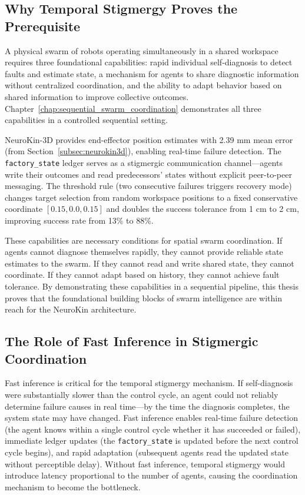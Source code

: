 \documentclass[12pt,a4paper,oneside]{report}
\begin{document}
\subsection{Why Temporal Stigmergy Proves the Prerequisite}
\label{subsec:why_temporal_stigmergy_proves_the_prerequisite_1}

A physical swarm of robots operating simultaneously in a shared workspace requires three foundational capabilities: rapid individual self-diagnosis to detect faults and estimate state, a mechanism for agents to share diagnostic information without centralized coordination, and the ability to adapt behavior based on shared information to improve collective outcomes. Chapter~\ref{chap:sequential_swarm_coordination} demonstrates all three capabilities in a controlled sequential setting.

NeuroKin-3D provides end-effector position estimates with 2.39 mm mean error (from Section~\ref{subsec:neurokin3d}), enabling real-time failure detection. The \texttt{factory\_state} ledger serves as a stigmergic communication channel—agents write their outcomes and read predecessors' states without explicit peer-to-peer messaging. The threshold rule (two consecutive failures triggers recovery mode) changes target selection from random workspace positions to a fixed conservative coordinate $[0.15, 0.0, 0.15]$ and doubles the success tolerance from 1 cm to 2 cm, improving success rate from 13\% to 88\%.

These capabilities are necessary conditions for spatial swarm coordination. If agents cannot diagnose themselves rapidly, they cannot provide reliable state estimates to the swarm. If they cannot read and write shared state, they cannot coordinate. If they cannot adapt based on history, they cannot achieve fault tolerance. By demonstrating these capabilities in a sequential pipeline, this thesis proves that the foundational building blocks of swarm intelligence are within reach for the NeuroKin architecture.

\subsection{The Role of Fast Inference in Stigmergic Coordination}
\label{subsec:the_role_of_fast_inference_in_stigmergic_coordination}

Fast inference is critical for the temporal stigmergy mechanism. If self-diagnosis were substantially slower than the control cycle, an agent could not reliably determine failure causes in real time—by the time the diagnosis completes, the system state may have changed. Fast inference enables real-time failure detection (the agent knows within a single control cycle whether it has succeeded or failed), immediate ledger updates (the \texttt{factory\_state} is updated before the next control cycle begins), and rapid adaptation (subsequent agents read the updated state without perceptible delay). Without fast inference, temporal stigmergy would introduce latency proportional to the number of agents, causing the coordination mechanism to become the bottleneck.
\end{document}
